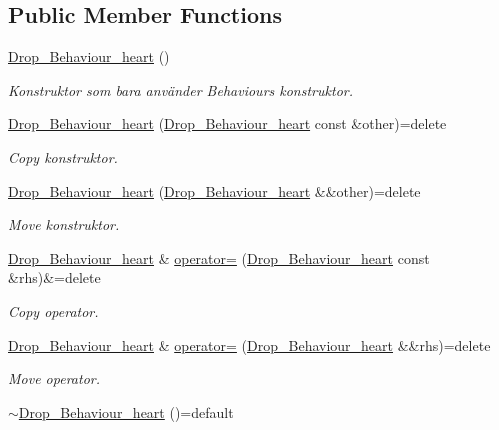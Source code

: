 \subsection*{Public Member Functions}
\begin{DoxyCompactItemize}
\item 
\hyperlink{classDrop__Behaviour__heart_ab0778d4ffa9b938005d57f580c8aebf7}{Drop\+\_\+\+Behaviour\+\_\+heart} ()
\begin{DoxyCompactList}\small\item\em Konstruktor som bara använder Behaviours konstruktor. \end{DoxyCompactList}\item 
\hyperlink{classDrop__Behaviour__heart_a8554c784f0215bad588437e37a5674a0}{Drop\+\_\+\+Behaviour\+\_\+heart} (\hyperlink{classDrop__Behaviour__heart}{Drop\+\_\+\+Behaviour\+\_\+heart} const \&other)=delete
\begin{DoxyCompactList}\small\item\em Copy konstruktor. \end{DoxyCompactList}\item 
\hyperlink{classDrop__Behaviour__heart_a782f27c01ccfffeca4e5ee1d793adec7}{Drop\+\_\+\+Behaviour\+\_\+heart} (\hyperlink{classDrop__Behaviour__heart}{Drop\+\_\+\+Behaviour\+\_\+heart} \&\&other)=delete
\begin{DoxyCompactList}\small\item\em Move konstruktor. \end{DoxyCompactList}\item 
\hyperlink{classDrop__Behaviour__heart}{Drop\+\_\+\+Behaviour\+\_\+heart} \& \hyperlink{classDrop__Behaviour__heart_a9fda609e7c9ec29d050e7952e3600674}{operator=} (\hyperlink{classDrop__Behaviour__heart}{Drop\+\_\+\+Behaviour\+\_\+heart} const \&rhs)\&=delete
\begin{DoxyCompactList}\small\item\em Copy operator. \end{DoxyCompactList}\item 
\hyperlink{classDrop__Behaviour__heart}{Drop\+\_\+\+Behaviour\+\_\+heart} \& \hyperlink{classDrop__Behaviour__heart_a8b01d23278f6521ef9374208eda83972}{operator=} (\hyperlink{classDrop__Behaviour__heart}{Drop\+\_\+\+Behaviour\+\_\+heart} \&\&rhs)=delete
\begin{DoxyCompactList}\small\item\em Move operator. \end{DoxyCompactList}\item 
\hyperlink{classDrop__Behaviour__heart_a2f8021b6474c8c010969cc12cd2b8cc1}{$\sim$\+Drop\+\_\+\+Behaviour\+\_\+heart} ()=default

\end{DoxyCompactItemize}
